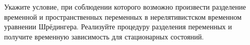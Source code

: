 \documentclass[__main__.tex]{subfiles}
\begin{document}
Укажите условие, при соблюдении которого возможно произвести разделение временной и пространственных переменных в нерелятивистском временном уравнении Шрёдингера. Реализуйте процедуру разделения переменных и получите временную зависимость для стационарных состояний.\\ 

\end{document}
